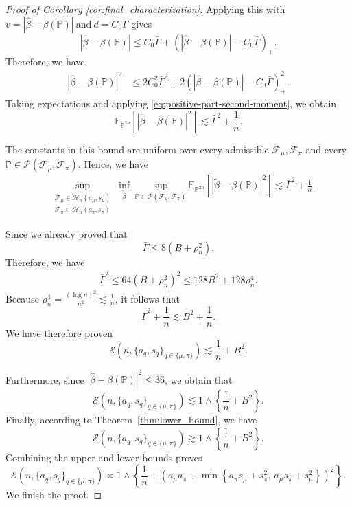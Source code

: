 \documentclass[11pt]{article}
\begin{document}
\begin{proof}[Proof of Corollary \ref{cor:final_characterization}]
Applying this with $v=
\left|
\widehat\beta-\beta(\mathbb P)
\right|
\ \text{and}\ 
d=C_0\bar\Gamma$ gives
\[
\left|
\widehat\beta-\beta(\mathbb P)
\right|
\le
C_0\bar\Gamma+
\left(
\left|
\widehat\beta-\beta(\mathbb P)
\right|
-C_0\bar\Gamma
\right)_+.
\]
Therefore, we have
\begin{align*}
\left|
\widehat\beta-\beta(\mathbb P)
\right|^2
&\le
2C_0^2\bar\Gamma^2
+
2\left(
\left|
\widehat\beta-\beta(\mathbb P)
\right|
-C_0\bar\Gamma
\right)_+^2.
\end{align*}
Taking expectations and applying
\eqref{eq:positive-part-second-moment}, we obtain
\[
\mathbb E_{\mathbb P^{2n}}
\left[
\left|
\widehat\beta-\beta(\mathbb P)
\right|^2
\right]
\lesssim
\bar\Gamma^2+\frac1n.
\]

The constants in this bound are uniform over every admissible
\(\mathcal F_\mu,\mathcal F_\pi\) and every
\(\mathbb P\in\mathcal P(\mathcal F_\mu,\mathcal F_\pi)\). Hence, we have
\begin{align*}
&\sup_{\substack{
\mathcal F_\mu\in\mathcal H_n(a_\mu,s_\mu)\\
\mathcal F_\pi\in\mathcal H_n(a_\pi,s_\pi)
}}
\inf_{\widetilde\beta}
\sup_{\mathbb P\in
\mathcal P(\mathcal F_\mu,\mathcal F_\pi)}
\mathbb E_{\mathbb P^{2n}}
\left[
\left|
\widetilde\beta-\beta(\mathbb P)
\right|^2
\right]
\lesssim
\bar\Gamma^2+\frac1n.
\end{align*}

Since we already proved that
\[
\bar\Gamma
\le
8(B+\rho_n^2).
\]
Therefore, we have
\begin{align*}
\bar\Gamma^2
\le
64(B+\rho_n^2)^2
\le
128B^2+128\rho_n^4.
\end{align*}
Because $\rho_n^4
=
\frac{(\log n)^2}{n^2}
\lesssim
\frac1n$, it follows that
\[
\bar\Gamma^2+\frac1n
\lesssim
B^2+\frac1n.
\]
We have therefore proven
\[
\mathcal E
\left(
n,\{a_q,s_q\}_{q\in\{\mu,\pi\}}
\right)
\lesssim
\frac1n+B^2.
\]

Furthermore, since $\left|
\widehat\beta-\beta(\mathbb P)
\right|^2\le36$, we obtain that
\[
\mathcal E
\left(
n,\{a_q,s_q\}_{q\in\{\mu,\pi\}}
\right)
\lesssim
1\wedge
\left\{
\frac1n+B^2
\right\}.
\]
Finally, according to Theorem~\ref{thm:lower_bound}, we have
\[
\mathcal E
\left(
n,\{a_q,s_q\}_{q\in\{\mu,\pi\}}
\right)
\gtrsim
1\wedge
\left\{
\frac1n+B^2
\right\}.
\]
Combining the upper and lower bounds proves
\[
\mathcal E
\left(
n,\{a_q,s_q\}_{q\in\{\mu,\pi\}}
\right)
\asymp
1\wedge
\left\{
\frac1n+
\left(
a_\mu a_\pi+
\min\left\{
a_\pi s_\mu+s_\pi^2,\,
a_\mu s_\pi+s_\mu^2
\right\}
\right)^2
\right\}.
\]
We finish the proof.
\end{proof}
\end{document}
